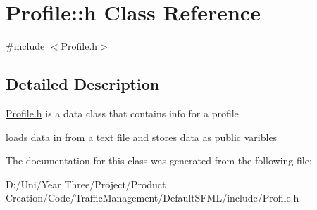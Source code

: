 \hypertarget{class_profile_1_1h}{}\section{Profile\+:\+:h Class Reference}
\label{class_profile_1_1h}


{\ttfamily \#include $<$Profile.\+h$>$}



\subsection{Detailed Description}
\hyperlink{class_profile_1_1h}{Profile.\+h} is a data class that contains info for a profile

loads data in from a text file and stores data as public varibles 

The documentation for this class was generated from the following file\+:\begin{DoxyCompactItemize}
\item 
D\+:/\+Uni/\+Year Three/\+Project/\+Product Creation/\+Code/\+Traffic\+Management/\+Default\+S\+F\+M\+L/include/Profile.\+h\end{DoxyCompactItemize}
